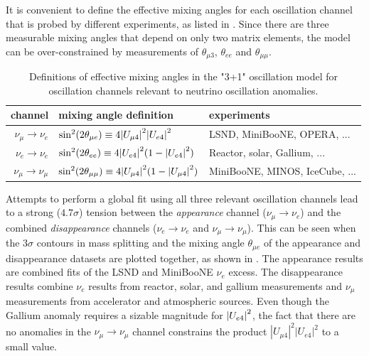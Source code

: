 It is convenient to define the effective mixing angles for each oscillation channel that is probed by different experiments, as listed in .
Since there are three measurable mixing angles that depend on only two matrix elements, the model can be over-constrained by measurements of $\theta_{\mu 3}$, $\theta_{ee}$ and $\theta_{\mu\mu}$.
\begin{table}
    \caption{Definitions of effective mixing angles in the "3+1" oscillation model for oscillation channels relevant to neutrino oscillation anomalies.\label{tab:effective-mixing-definitions}}
    \begin{tabular}{rl>{\raggedright\arraybackslash}p{3cm}}\toprule
        channel & mixing angle definition & experiments \\ \midrule
        $\nu_\mu \rightarrow \nu_e$ & $\sin^2(2\theta_{\mu e}) \equiv 4\abs{U_{\mu 4}}^2\abs{U_{e4}}^2$ & LSND, MiniBooNE, OPERA, ... \\
        $\nu_e \rightarrow \nu_e$ & $\sin^2(2\theta_{e e}) \equiv 4\abs{U_{e 4}}^2(1 - \abs{U_{e4}}^2)$ & Reactor, solar, Gallium, ... \\
        $\nu_\mu \rightarrow \nu_\mu$ & $\sin^2(2\theta_{\mu \mu}) \equiv 4\abs{U_{\mu 4}}^2(1 - \abs{U_{\mu4}}^2)$ & MiniBooNE, MINOS, IceCube, ... \\ \bottomrule
    \end{tabular}
\end{table}
Attempts to perform a global fit using all three relevant oscillation channels lead to a strong ($4.7\sigma$) tension between the \emph{appearance} channel ($\nu_\mu \rightarrow \nu_e$) and the combined \emph{disappearance} channels ($\nu_e \rightarrow \nu_e$ and $\nu_\mu \rightarrow \nu_\mu$)\cite{Dentler_2018}. This can be seen when the $3\sigma$ contours in mass splitting and the mixing angle $\theta_{\mu e}$ of the appearance and disappearance datasets are plotted together, as shown in . The appearance results are combined fits of the LSND and MiniBooNE $\nu_e$ excess. The disappearance results combine $\nu_e$ results from reactor, solar, and gallium measurements and $\nu_\mu$ measurements from accelerator and atmospheric sources. Even though the Gallium anomaly requires a sizable magnitude for $\abs{U_{e4}}^2$, the fact that there are no anomalies in the $\nu_\mu \rightarrow \nu_\mu$ channel constrains the product $|U_{\mu 4}|^2|U_{e4}|^2$ to a small value.
